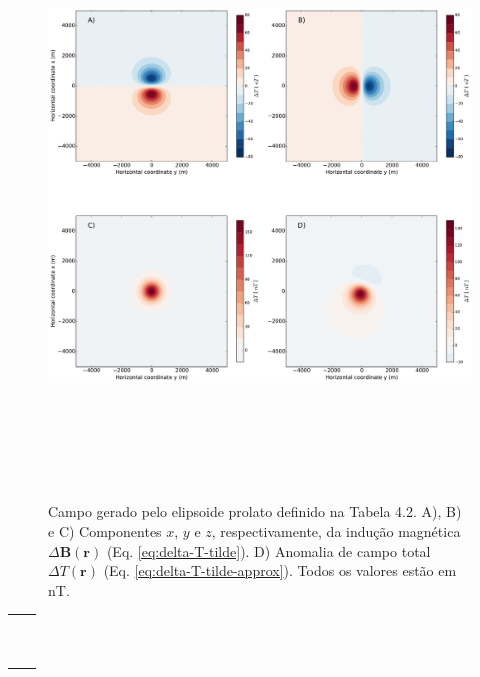 \begin{figure}[hbt!]
	\centering \includegraphics[width=16cm,height=16cm]{figures/ellipsoid_prolate}
	\caption[Campo gerado pelo elipsoide prolato definido na Tabela 4.2. A), B) e C) Componentes $x$, $y$ e $z$, respectivamente, da indução magnética $\Delta \mathbf{B}(\mathbf{r})$ (Eq. \ref{eq:delta-T-tilde}). D) Anomalia de campo total $\Delta T (\mathbf{r})$ (Eq. \ref{eq:delta-T-tilde-approx}). Todos os valores estão em nT.]{Campo gerado pelo elipsoide prolato definido na Tabela 4.2. A), B) e C) Componentes $x$, $y$ e $z$, respectivamente, da indução magnética $\Delta \mathbf{B}(\mathbf{r})$ (Eq. \ref{eq:delta-T-tilde}). D) Anomalia de campo total $\Delta T (\mathbf{r})$ (Eq. \ref{eq:delta-T-tilde-approx}). Todos os valores estão em nT.}
	\label{fig:prolate}
\end{figure}

\begin{table}[h!]
	\begin{center}
		\begin{tabular}{lc}
			
			&  \\
			& \\
			& \\
			& \\
			& \\
			& \\ 
			& \\
			& \\
						& \\
						& \\
		\end{tabular}
	\end{center}
\end{table}


